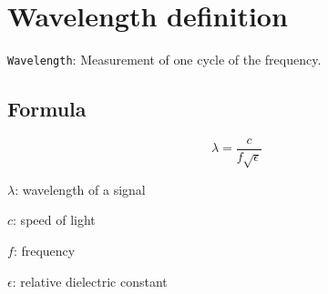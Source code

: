\documentclass[a4paper, 10pt]{scrartcl}
\begin{document}
\tableofcontents
\newpage

\section{Wavelength definition}

\texttt{Wavelength}: Measurement of one cycle of the frequency.

\subsection{Formula}

\begin{displaymath}
\lambda = \frac{c}{f\sqrt{\epsilon}}
\end{displaymath}

$\lambda$: wavelength of a signal

$c$: speed of light

$f$: frequency

$\epsilon$: relative dielectric constant
\end{document}
